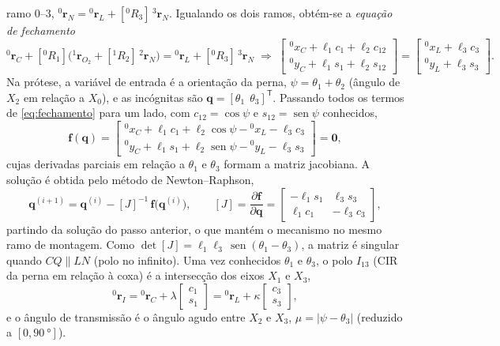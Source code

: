 \documentclass[12pt,a4paper,twoside]{article}
\DeclareMathOperator{\sen}{sen}
\newcommand{\rv}[2]{{}^{#1}\mathbf{r}_{#2}}          %
\newcommand{\Rm}[2]{[{}^{#1}R_{#2}]}                 %
\numberwithin{equation}{section}
\begin{document}
ramo $0\text{--}3$, $\rv{0}{N} = \rv{0}{L} + \Rm{0}{3}\,\rv{3}{N}$. Igualando os dois ramos, obtém-se a
\emph{equação de fechamento}
\begin{equation}
  \rv{0}{C} + \Rm{0}{1}\Big(\rv{1}{O_2} + \Rm{1}{2}\,\rv{2}{N}\Big) = \rv{0}{L} + \Rm{0}{3}\,\rv{3}{N}
  \;\Longrightarrow\;
  \begin{bmatrix} {}^0x_C + \ell_1 c_1 + \ell_2 c_{12} \\ {}^0y_C + \ell_1 s_1 + \ell_2 s_{12} \end{bmatrix}
  = \begin{bmatrix} {}^0x_L + \ell_3 c_3 \\ {}^0y_L + \ell_3 s_3 \end{bmatrix}.
  \label{eq:fechamento}
\end{equation}
Na prótese, a variável de entrada é a orientação da perna, $\psi = \theta_1 + \theta_2$
(ângulo de $X_2$ em relação a $X_0$), e as incógnitas são $\mathbf q = [\theta_1\ \ \theta_3]^{\mathsf T}$.
Passando todos os termos de \eqref{eq:fechamento} para um lado, com $c_{12} = \cos\psi$ e
$s_{12} = \sen\psi$ conhecidos,
\begin{equation*}
  \mathbf f(\mathbf q) =
  \begin{bmatrix} {}^0x_C + \ell_1 c_1 + \ell_2\cos\psi - {}^0x_L - \ell_3 c_3 \\
                  {}^0y_C + \ell_1 s_1 + \ell_2\sen\psi - {}^0y_L - \ell_3 s_3 \end{bmatrix} = \mathbf 0 ,
\end{equation*}
cujas derivadas parciais em relação a $\theta_1$ e $\theta_3$ formam a matriz jacobiana. A
solução é obtida pelo método de Newton--Raphson,
\begin{equation}
  \mathbf q^{(i+1)} = \mathbf q^{(i)} - [J]^{-1}\,\mathbf f\big(\mathbf q^{(i)}\big),
  \qquad
  [J] = \frac{\partial\mathbf f}{\partial\mathbf q} =
  \begin{bmatrix} -\ell_1 s_1 & \ell_3 s_3 \\ \ell_1 c_1 & -\ell_3 c_3 \end{bmatrix},
  \label{eq:newton}
\end{equation}
partindo da solução do passo anterior, o que mantém o mecanismo no mesmo ramo de
montagem. Como $\det[J] = \ell_1\ell_3\,\sen(\theta_1 - \theta_3)$, a matriz é singular quando
$CQ \parallel LN$ (polo no infinito). Uma vez conhecidos $\theta_1$ e $\theta_3$, o polo
$I_{13}$ (CIR da perna em relação à coxa) é a intersecção dos eixos $X_1$ e $X_3$,
\begin{equation}
  \rv{0}{I} = \rv{0}{C} + \lambda\begin{bmatrix} c_1\\ s_1\end{bmatrix} = \rv{0}{L} + \kappa\begin{bmatrix} c_3\\ s_3\end{bmatrix},
\end{equation}
e o ângulo de transmissão é o ângulo agudo entre $X_2$ e $X_3$, $\mu = |\psi - \theta_3|$
(reduzido a $[0, \SI{90}{\degree}]$).
\end{document}

